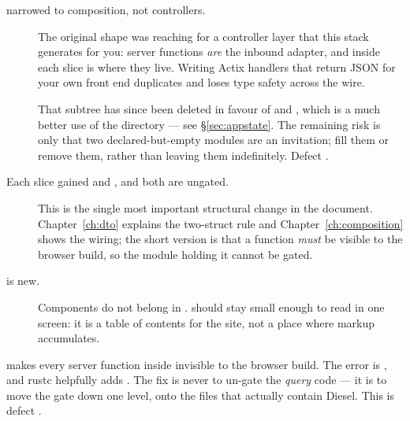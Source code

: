 \begin{description}
  \item[ narrowed to composition, not controllers.] The original
     shape was reaching for a controller layer that this stack
    generates for you: server functions \emph{are} the inbound adapter, and  inside
    each slice is where they live. Writing Actix handlers that return JSON for your own front end
    duplicates \code{\#[server]} and loses type safety across the wire.

    That subtree has since been deleted in favour of  and
    , which is a much better use of the directory --- see
    \S\ref{sec:appstate}. The remaining risk is only that two declared-but-empty modules are an
    invitation; fill them or remove them, rather than leaving them indefinitely. Defect .

  \item[Each slice gained  and , and both are ungated.] This is the
    single most important structural change in the document. Chapter~\ref{ch:dto} explains the
    two-struct rule and Chapter~\ref{ch:composition} shows the wiring; the short version is that
    a \code{\#[server]} function \emph{must} be visible to the browser build, so the module
    holding it cannot be gated.

  \item[ is new.] Components do not belong in .  should
    stay small enough to read in one screen: it is a table of contents for the site, not a place
    where markup accumulates.
\end{description}

\begin{pitfall}
 makes every server function inside
 invisible to the browser build. The error is
, and
rustc helpfully adds . The fix is never to un-gate the \emph{query} code --- it is to move the gate down
one level, onto the files that actually contain Diesel. This is defect .
\end{pitfall}

